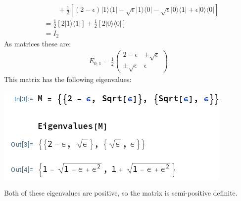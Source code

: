 \documentclass[12pt,a4]{article}
\begin{document}
\begin{enumerate}
\begin{enumerate}
\begin{align*}
                    & \qquad + \frac{1}{2}\left[(2 - \epsilon)|1\rangle \langle 1| - \sqrt{\epsilon} |1\rangle \langle 0| - \sqrt{\epsilon} |0\rangle \langle 1| + \epsilon |0\rangle \langle 0|\right]\\
                    &= \frac{1}{2}\left[2 |1\rangle \langle 1|\right] + \frac{1}{2}\left[2 |0\rangle \langle 0|\right]\\
                    &= I_2 
        \end{align*}
        As matrices these are:
        \begin{align*}
          E_{0,1} =
            \frac{1}{2}
            \left(
              \begin{matrix}
                2 - \epsilon & \pm \sqrt{\epsilon} \\
                \pm \sqrt{\epsilon} & \epsilon
              \end{matrix}
            \right)
        \end{align*}
        This matrix has the following eigenvalues:
        \begin{center}
          \includegraphics[scale=0.5]{MatrixEigenValues.png}
        \end{center}
        Both of these eigenvalues are positive, so the matrix is semi-positive definite.



\end{enumerate}
\end{enumerate}
\end{document}
